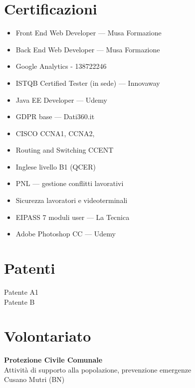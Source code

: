 \documentclass[a4paper,10pt]{article}
\begin{document}
\section*{\faCertificate \quad Certificazioni}
\begin{multicols}{2}
\begin{itemize}[leftmargin=*]
  \item Front End Web Developer — Musa Formazione
  \item Back End Web Developer — Musa Formazione
  \item Google Analytics - 138722246
  \item ISTQB Certified Tester (in sede) — Innovaway
  \item Java EE Developer — Udemy
  \item GDPR base — Dati360.it
  \item CISCO CCNA1, CCNA2, 
  \item Routing and Switching CCENT
  \item Inglese livello B1 (QCER)
  \item PNL — gestione conflitti lavorativi
  \item Sicurezza lavoratori e videoterminali
  \item EIPASS 7 moduli user — La Tecnica
  \item Adobe Photoshop CC — Udemy
\end{itemize}
\end{multicols}

\noindent
\hrulefill
\vspace{0.5em} %

\begin{minipage}[t]{0.50\textwidth}
    \section*{\faCar \quad \textbf{Patenti}}
    Patente A1\\
    Patente B
\end{minipage}%
\hfill
\begin{minipage}[t]{0.50\textwidth}
    \section*{\faHandsHelping \quad \textbf{Volontariato}}
    \textbf {Protezione Civile Comunale \quad {[dal 15/09/2017]}}\\
    Attività di supporto alla popolazione, prevenzione emergenze\\
    Cusano Mutri (BN)
\end{minipage}
\end{document}
